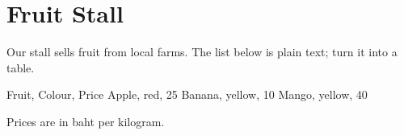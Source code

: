 \documentclass{article}
\begin{document}
\section{Fruit Stall}
Our stall sells fruit from local farms. The list below is plain text;
turn it into a table.

Fruit, Colour, Price
Apple, red, 25
Banana, yellow, 10
Mango, yellow, 40

Prices are in baht per kilogram.
\end{document}

